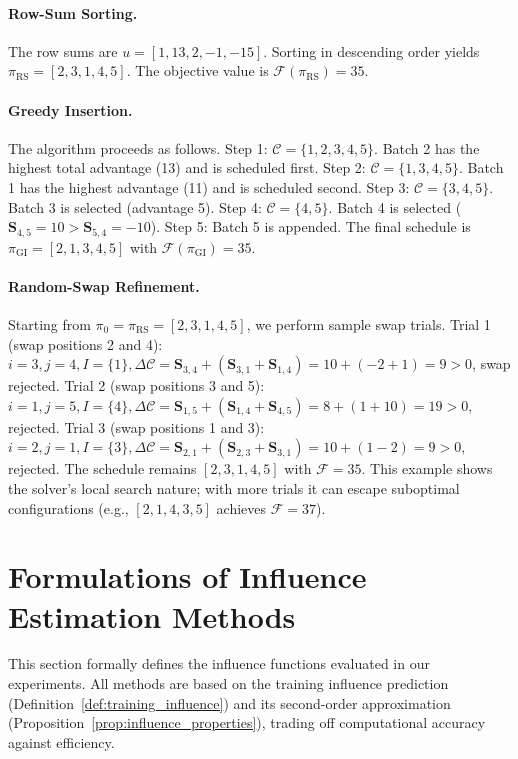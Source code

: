 \paragraph{Row-Sum Sorting.} The row sums are $u = [1, 13, 2, -1, -15]$. Sorting in descending order yields $\pi_{\text{RS}} = [2, 3, 1, 4, 5]$. The objective value is $\mathcal{F}(\pi_{\text{RS}}) = 35$.

\paragraph{Greedy Insertion.} The algorithm proceeds as follows. Step 1: $\mathcal{C}=\{1,2,3,4,5\}$. Batch 2 has the highest total advantage (13) and is scheduled first. Step 2: $\mathcal{C}=\{1,3,4,5\}$. Batch 1 has the highest advantage (11) and is scheduled second. Step 3: $\mathcal{C}=\{3,4,5\}$. Batch 3 is selected (advantage 5). Step 4: $\mathcal{C}=\{4,5\}$. Batch 4 is selected ($\mathbf{S}_{4,5}=10 > \mathbf{S}_{5,4}=-10$). Step 5: Batch 5 is appended. The final schedule is $\pi_{\text{GI}} = [2, 1, 3, 4, 5]$ with $\mathcal{F}(\pi_{\text{GI}}) = 35$.

\paragraph{Random-Swap Refinement.} Starting from $\pi_0 = \pi_{\text{RS}} = [2,3,1,4,5]$, we perform sample swap trials. Trial 1 (swap positions 2 and 4): $i=3, j=4, I=\{1\}, \Delta\mathcal{C} = \mathbf{S}_{3,4} + (\mathbf{S}_{3,1}+\mathbf{S}_{1,4}) = 10 + (-2+1) = 9 > 0$, swap rejected. Trial 2 (swap positions 3 and 5): $i=1, j=5, I=\{4\}, \Delta\mathcal{C} = \mathbf{S}_{1,5} + (\mathbf{S}_{1,4}+\mathbf{S}_{4,5}) = 8 + (1+10) = 19 > 0$, rejected. Trial 3 (swap positions 1 and 3): $i=2, j=1, I=\{3\}, \Delta\mathcal{C} = \mathbf{S}_{2,1} + (\mathbf{S}_{2,3}+\mathbf{S}_{3,1}) = 10 + (1-2) = 9 > 0$, rejected. The schedule remains $[2,3,1,4,5]$ with $\mathcal{F}=35$. This example shows the solver's local search nature; with more trials it can escape suboptimal configurations (e.g., $[2,1,4,3,5]$ achieves $\mathcal{F}=37$).

\clearpage
\section{Formulations of Influence Estimation Methods}
\label{sec:influence_derivations}

This section formally defines the influence functions evaluated in our experiments. All methods are based on the training influence prediction (Definition~\ref{def:training_influence}) and its second-order approximation (Proposition~\ref{prop:influence_properties}), trading off computational accuracy against efficiency.

